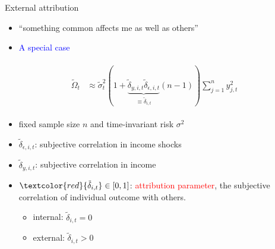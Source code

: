 \documentclass{beamer}
\begin{document}
\begin{frame}{External attribution }
		\begin{itemize}
		\item ``something common affects me as well as others''
	\end{itemize}
	
	\begin{itemize}
		\item \textcolor{blue}{A special case}
	\end{itemize}
		\begin{eqnarray}
	\begin{split}
	\tilde \Omega_{t}  & \approx \tilde \sigma^2_{t} (1+\underbrace{\tilde \delta_{y,i,t}\tilde \delta_{\epsilon,i,t}}_{\equiv \tilde \delta_{i,t}}(n-1)) \sum^{n}_{j=1}y^2_{j,t} 
	\end{split}
	\end{eqnarray}
		\begin{itemize}
		\item fixed sample size $n$ and time-invariant risk $\sigma^2$ 
		\item $\tilde \delta_{\epsilon, i,t}$: subjective correlation in income shocks 
		\item $\tilde \delta_{y, i,t}$: subjective correlation in income 
		\item $\textcolor{red}{\tilde \delta_{i,t}} \in [0,1]$: \textcolor{red}{attribution parameter}, the subjective correlation of individual outcome with others. 
			\begin{itemize}
				\item internal: $\tilde \delta_{i,t} =0$
				\item external: $\tilde \delta_{i,t} >0$
			\end{itemize}
		\end{itemize}
		\end{frame}
\end{document}
